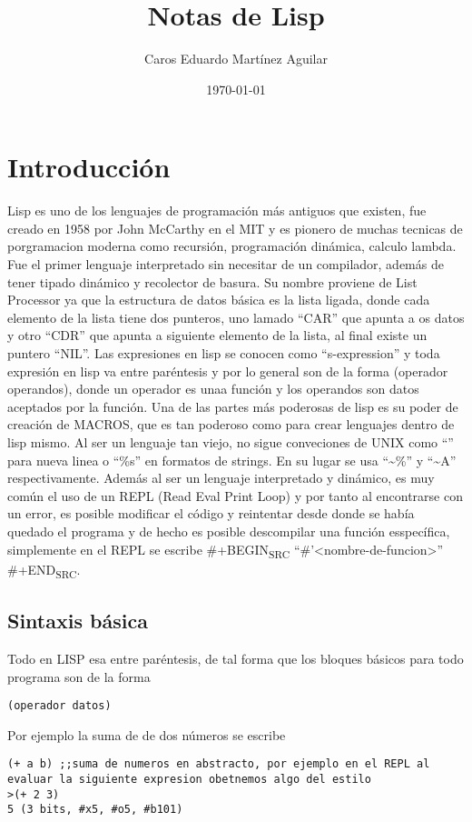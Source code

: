 \documentclass[11pt]{article}
\author{Caros Eduardo Martínez Aguilar}
\date{\today}
\title{Notas de Lisp}
\begin{document}
\maketitle
\tableofcontents


\section{Introducción}
\label{sec:org5b037e8}
Lisp es uno de los lenguajes de programación más antiguos que existen, fue creado en 1958 por John McCarthy en el MIT y es pionero de muchas tecnicas de porgramacion moderna como recursión, programación dinámica, calculo lambda. Fue el primer lenguaje interpretado sin necesitar de un compilador, además de tener tipado dinámico y recolector de basura. Su nombre proviene de List Processor ya que la estructura de datos básica es la lista ligada, donde cada elemento de la lista tiene dos punteros, uno lamado ``CAR'' que apunta a os datos y otro ``CDR'' que apunta a siguiente elemento de la lista, al final existe un puntero ``NIL''.
Las expresiones en lisp se conocen como ``s-expression'' y toda expresión en lisp va entre paréntesis y por lo general son de la forma (operador operandos), donde un operador es unaa función y los operandos son datos aceptados por la función.
Una de las partes más poderosas de lisp es su poder de creación de MACROS, que es tan poderoso como para crear lenguajes dentro de lisp mismo.
Al ser un lenguaje tan viejo, no sigue conveciones de UNIX como ``\n'' para nueva linea o ``\%s'' en formatos de strings. En su lugar se usa ``\textasciitilde{}\%'' y ``\textasciitilde{}A'' respectivamente. Además al ser un lenguaje interpretado y dinámico, es muy común el uso de un REPL (Read Eval Print Loop) y por tanto al encontrarse con un error, es posible modificar el código y reintentar desde donde se había quedado el programa y de hecho es posible descompilar una función esspecífica, simplemente en el REPL se escribe
\#+BEGIN\textsubscript{SRC} ``\#'<nombre-de-funcion>'' \#+END\textsubscript{SRC}.
\subsection{Sintaxis básica}
\label{sec:orgc4a5724}
Todo en LISP esa entre paréntesis, de tal forma que los bloques básicos para todo programa son de la forma
\begin{verbatim}
(operador datos)
\end{verbatim}
Por ejemplo la suma de de dos números se escribe
\begin{verbatim}
(+ a b) ;;suma de numeros en abstracto, por ejemplo en el REPL al evaluar la siguiente expresion obetnemos algo del estilo
>(+ 2 3)
5 (3 bits, #x5, #o5, #b101)
\end{verbatim}
\end{document}
